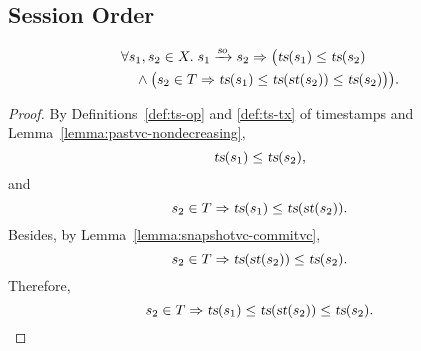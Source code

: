 
\subsection{Session Order}  \label{ss:so}

\begin{applemma} \label{lemma:so-ts}
  \begin{align*}
    &\forall \txevents_{1}, \txevents_{2} \in X.\;
      \txevents_{1} \rel{\so} \txevents_{2} \implies
      \big(\timestamp(\txevents_{1}) \le \timestamp(\txevents_{2}) \\
      &\quad \land \big(\txevents_{2} \in \txs
        \implies \timestamp(\txevents_{1})
          \le \timestamp(\startoftx(\txevents_{2}))
          \le \timestamp(\txevents_{2})\big)\big).
  \end{align*}
\end{applemma}

\begin{proof} \label{proof:so-ts}
  By Definitions~\ref{def:ts-op} and \ref{def:ts-tx} of timestamps
  and Lemma~\ref{lemma:pastvc-nondecreasing},
  \[
    \textsl{ts}(s_{1}) \le \textsl{ts}(s_{2}),
  \]
  and
  \[
    \txevents_{2} \in \txs \implies
      \timestamp(\txevents_{1}) \le \timestamp(\startoftx(\txevents_{2})).
  \]
  Besides, by Lemma~\ref{lemma:snapshotvc-commitvc},
  \[
    \txevents_{2} \in \txs \implies
      \timestamp(\startoftx(\txevents_{2})) \le \timestamp(\txevents_{2}).
  \]
  Therefore,
  \[
    \txevents_{2} \in \txs \implies
      \timestamp(\txevents_{1}) \le \timestamp(\startoftx(\txevents_{2}))
      \le \timestamp(\txevents_{2}).
  \]
\end{proof}
